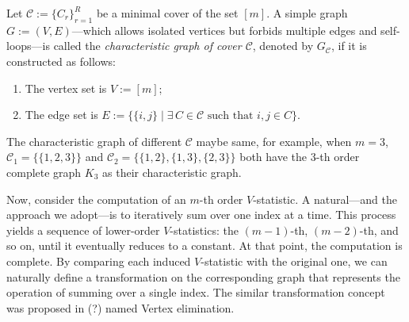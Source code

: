 \documentclass[letterpaper,11pt]{article}
\newcommand{\cover}{\mathcal{C}}
\newcommand{\graphcoverp}[1]{G_{#1}}
\begin{document}
\begin{definition}\label{def:graph}
    Let $\cover := \{C_r\}_{r=1}^R$ be a minimal cover of the set $[m]$. A simple graph $G := (V, E)$—which allows isolated vertices but forbids multiple edges and self-loops—is called the \emph{characteristic graph of cover $\cover$}, denoted by $\graphcoverp{\cover}$, if it is constructed as follows:
    \begin{enumerate}
        \item The vertex set is $V := [m]$;
        \item The edge set is $E := \{\{i,j\} \mid \exists \, C \in \cover \text{ such that } i, j \in C\}$.
    \end{enumerate}

\end{definition}
\begin{remark}
    The characteristic graph of different $\cover$ maybe same, for example, when $m=3$, $\cover_{1} = \{ \{ 1,2,3 \}\}$ and $\cover_{2} = \{ \{ 1,2\}, \{ 1,3\}, \{ 2, 3 \}\}$ both have the $3$-th order complete graph $K_{3}$ as their characteristic graph.
\end{remark}



Now, consider the computation of an $m$-th order $V$-statistic. A natural—and the approach we adopt—is to iteratively sum over one index at a time. This process yields a sequence of lower-order $V$-statistics: the $(m-1)$-th, $(m-2)$-th, and so on, until it eventually reduces to a constant. At that point, the computation is complete. By comparing each induced $V$-statistic with the original one, we can naturally define a transformation on the corresponding graph that represents the operation of summing over a single index. The similar transformation concept was proposed in (?) named Vertex elimination. 
\end{document}
